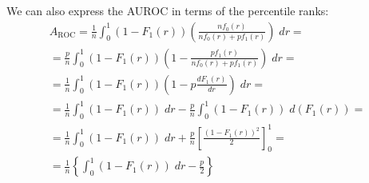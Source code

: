 
We can also express the AUROC in terms of the percentile ranks:
%
\begin{multline*}
    A_\text{ROC}
    = \frac{1}{n} \int_{0}^{1}
        (1 - F_1(r)) \left(\frac{n f_0(r)}{nf_0(r) + pf_1(r)}\right) \;dr
    =\\
    =  \frac{p}{n} \int_{0}^{1}
        (1 - F_1(r)) \left(1 - \frac{pf_1(r)}{nf_0(r) + pf_1(r)}\right) \;dr
    =\\
        = \frac{1}{n} \int_{0}^{1} (1 - F_1(r)) \left(1 - p \frac{dF_1(r)}{dr}\right) \;dr
    =\\
    =
        \frac{1}{n} \int_{0}^{1} (1 - F_1(r)) \;dr
        - \frac{p}{n} \int_{0}^{1}
            (1 - F_1(r)) \;d(F_1(r))
    =\\
    =
        \frac{1}{n} \int_{0}^{1} (1 - F_1(r)) \;dr
        + \frac{p}{n} \left[
            \frac{(1 - F_1(r))^2}{2}
        \right]^1_0
    =\\
    =
        \frac{1}{n} \left\{
            \int_{0}^{1} (1 - F_1(r)) \;dr - \frac{p}{2}
        \right\}
    \label{eq:auroc ranks}
\end{multline*}

